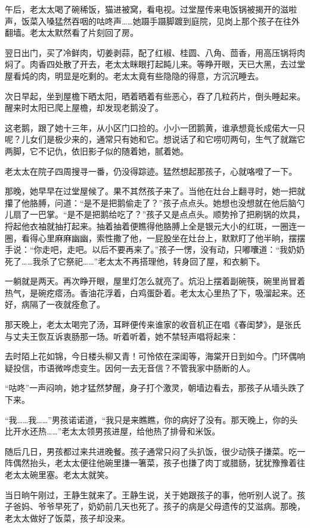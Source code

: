 \documentclass{ctexart}
\renewcommand{\\}{\par}
\begin{document}
\\午后，老太太喝了碗稀饭，猫进被窝，看电视。过堂屋传来电饭锅被揭开的滋啦声，饭菜入嗓猛然吞咽的咕咚声……她蹑手蹑脚踱到庭院，见岗上那个孩子在往外翻墙。老太太默然看了片刻回了房。
\\翌日出门，买了冷鲜肉，切姜剥蒜，配了红椒、桂圆、八角、茴香，用高压锅将肉焖了。肉香四处散了开去，老太太眯眼打起盹儿来。等睁开眼，天已大黑，去过堂屋看炖的肉，明显是吃剩的。老太太竟有些隐隐的得意，方沉沉睡去。
\\次日早起，坐到屋檐下晒太阳，晒着晒着有些恶心，吞了几粒药片，倒头睡起来。醒来时太阳已爬上屋檐，却发现老鹅没了。
\\这老鹅，跟了她十三年，从小区门口捡的。小小一团鹅黄，谁承想竟长成偌大一只呢？儿女们是极少来的，通常只有她和它。想说话了和它唠叨两句，生气了就踹它两脚，它不记仇，依旧影子似的随着她，腻着她。
\\老太太在院子四周搜寻一番，仍没得踪迹。猛然想起那孩子，心就咯噔了一下。
\\那晚，她早早在过堂屋候了。果不其然孩子来了。当他在灶台上翻寻时，她一把就攥了他胳膊，问道：“是不是把鹅偷走了？”孩子点点头。她想也没想就在他后脑勺儿扇了一巴掌。“是不是把鹅给吃了？”孩子又是点点头。顺势拎了把刷锅的炊具，捋起他衣袖就抽打起来。抽着抽着便瞧得他胳膊上全是银元大小的红斑，一圈连一圈，看得心里麻麻幽幽，索性撒了他，一屁股坐在灶台上，默默盯了他半晌，摆摆手说：“你走吧，走吧。以后不要再来了。”孩子一愣，没有动，只嘟囔道：“我奶奶死了……我杀了它祭祀……”老太太不再搭理他，转身回了屋，和衣躺下。
\\一躺就是两天。再次睁开眼，屋里灯怎么就亮了。炕沿上摆着副碗筷，碗里尚冒着热气，是碗疙瘩汤。香油花浮着，白鸡蛋卧着。老太太心里热了下，吸溜起来。还好，病隔了一夜就痊愈了。
\\那天晚上，老太太喝完了汤，耳畔便传来谁家的收音机正在唱《春闺梦》，是张氏与丈夫王恢互诉衷肠那一场。听着听着，她不禁轻声唱将起来：
\\去时陌上花如锦，今日楼头柳又青！可怜侬在深闺等，海棠开日到如今。门环偶响疑投信，市语微哗虑变生。因何一去无音信？不管我家中肠断的人。
\\“咕咚”一声闷响，她才猛然梦醒，身子打个激灵，朝墙边看去，那孩子从墙头跌了下来。
\\“我……我……”男孩诺诺道，“我只是来瞧瞧，你的病好了没有。那天晚上，你的头比开水还热……”老太太领男孩进屋，给他热了排骨和米饭。
\\随后几日，男孩都过来共进晚餐。孩子通常只闷了头扒饭，很少动筷子搛菜。吃一阵偶然抬头，老太太便往他碗里搛一箸菜，孩子也搛了肉丁或腊肠，犹犹豫豫着往老太太碗里塞。老太太就笑。
\\当日晌午刚过，王静生就来了。王静生说，关于她跟孩子的事，他听别人说了。孩子爸妈、爷爷早死了，奶奶前几天也死了。孩子的病是父母遗传的艾滋病。那晚，老太太做好了饭菜，孩子却没来。
\end{document}
